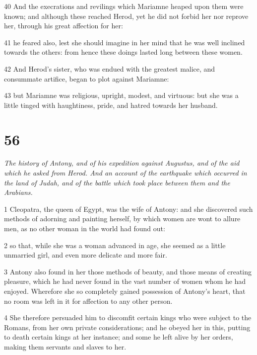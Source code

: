 \par 40 And the execrations and revilings which Mariamne heaped upon them were known; and although these reached Herod, yet he did not forbid her nor reprove her, through his great affection for her: 

\par 41 he feared also, lest she should imagine in her mind that he was well inclined towards the others: from hence these doings lasted long between these women. 

\par 42 And Herod’s sister, who was endued with the greatest malice, and consummate artifice, began to plot against Mariamne: 

\par 43 but Mariamne was religious, upright, modest, and virtuous: but she was a little tinged with haughtiness, pride, and hatred towards her husband.

\chapter{56}

\par \textit{The history of Antony, and of his expedition against Augustus, and of the aid which he asked from Herod. And an account of the earthquake which occurred in the land of Judah, and of the battle which took place between them and the Arabians.}

\par 1 Cleopatra, the queen of Egypt, was the wife of Antony: and she discovered such methods of adorning and painting herself, by which women are wont to allure men, as no other woman in the world had found out: 

\par 2 so that, while she was a woman advanced in age, she seemed as a little unmarried girl, and even more delicate and more fair. 

\par 3 Antony also found in her those methods of beauty, and those means of creating pleasure, which he had never found in the vast number of women whom he had enjoyed. Wherefore she so completely gained possession of Antony’s heart, that no room was left in it for affection to any other person. 

\par 4 She therefore persuaded him to discomfit certain kings who were subject to the Romans, from her own private considerations; and he obeyed her in this, putting to death certain kings at her instance; and some he left alive by her orders, making them servants and slaves to her.

